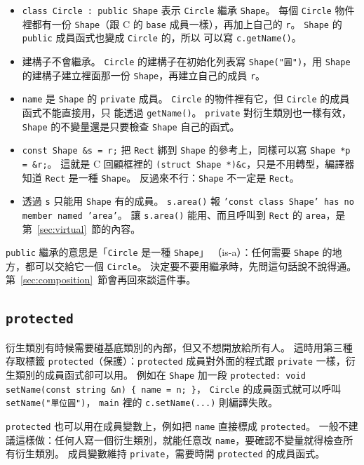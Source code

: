 \begin{itemize}
\item \texttt{class Circle : public Shape} 表示 \texttt{Circle} 繼承
\texttt{Shape}。 每個 \texttt{Circle} 物件裡都有一份 \texttt{Shape}（跟
C 的 \texttt{base} 成員一樣），再加上自己的 \texttt{r}。
\texttt{Shape} 的 \texttt{public} 成員函式也變成 \texttt{Circle} 的，所以
可以寫 \texttt{c.getName()}。
\item 建構子不會繼承。 \texttt{Circle} 的建構子在初始化列表寫
\texttt{Shape("圓")}，用 \texttt{Shape} 的建構子建立裡面那一份
\texttt{Shape}，再建立自己的成員 \texttt{r}。
\item \texttt{name} 是 \texttt{Shape} 的 \texttt{private} 成員。
\texttt{Circle} 的物件裡有它，但 \texttt{Circle} 的成員函式不能直接用，只
能透過 \texttt{getName()}。 \texttt{private} 對衍生類別也一樣有效，
\texttt{Shape} 的不變量還是只要檢查 \texttt{Shape} 自己的函式。
\item \texttt{const Shape \&s = r;} 把 \texttt{Rect} 綁到 \texttt{Shape}
的參考上，同樣可以寫 \texttt{Shape *p = \&r;}。 這就是 C 回顧框裡的
\texttt{(struct Shape *)\&c}，只是不用轉型，編譯器知道
\texttt{Rect} 是一種 \texttt{Shape}。 反過來不行：\texttt{Shape} 不一定是
\texttt{Rect}。
\item 透過 \texttt{s} 只能用 \texttt{Shape} 有的成員。 \texttt{s.area()}
報 \texttt{'const class Shape' has no member named 'area'}。 讓
\texttt{s.area()} 能用、而且呼叫到 \texttt{Rect} 的 \texttt{area}，是
第~\ref{sec:virtual}~節的內容。
\end{itemize}

\texttt{public} 繼承的意思是「\texttt{Circle} 是一種 \texttt{Shape}」
（is-a）：任何需要 \texttt{Shape} 的地方，都可以交給它一個
\texttt{Circle}。 決定要不要用繼承時，先問這句話說不說得通。
第~\ref{sec:composition}~節會再回來談這件事。

\subsection{\texttt{protected}}

衍生類別有時候需要碰基底類別的內部，但又不想開放給所有人。 這時用第三種
存取標籤 \texttt{protected}（保護）：\texttt{protected} 成員對外面的程式跟
\texttt{private} 一樣，衍生類別的成員函式卻可以用。 例如在 \texttt{Shape}
加一段 \texttt{protected: void setName(const string \&n) \{ name = n; \}}，
\texttt{Circle} 的成員函式就可以呼叫 \texttt{setName("單位圓")}，
\texttt{main} 裡的 \texttt{c.setName(...)} 則編譯失敗。

\texttt{protected} 也可以用在成員變數上，例如把 \texttt{name} 直接標成
\texttt{protected}。 一般不建議這樣做：任何人寫一個衍生類別，就能任意改
\texttt{name}，要確認不變量就得檢查所有衍生類別。 成員變數維持
\texttt{private}，需要時開 \texttt{protected} 的成員函式。

